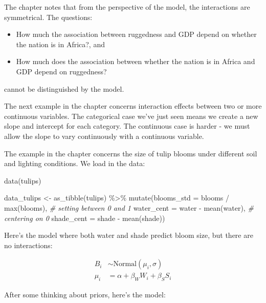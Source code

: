 \documentclass[
]{book}
\newenvironment{Shaded}{\begin{snugshade}}{\end{snugshade}}
\newcommand{\AttributeTok}[1]{\textcolor[rgb]{0.77,0.63,0.00}{#1}}
\newcommand{\CommentTok}[1]{\textcolor[rgb]{0.56,0.35,0.01}{\textit{#1}}}
\newcommand{\FunctionTok}[1]{\textcolor[rgb]{0.00,0.00,0.00}{#1}}
\newcommand{\NormalTok}[1]{#1}
\newcommand{\OtherTok}[1]{\textcolor[rgb]{0.56,0.35,0.01}{#1}}
\newcommand{\SpecialCharTok}[1]{\textcolor[rgb]{0.00,0.00,0.00}{#1}}
\providecommand{\tightlist}{%
  \setlength{\itemsep}{0pt}\setlength{\parskip}{0pt}}
\begin{document}
The chapter notes that from the perspective of the model, the interactions are symmetrical. The questions:

\begin{itemize}
\tightlist
\item
  How much the association between ruggedness and GDP depend on whether the nation is in Africa?, and
\item
  How much does the association between whether the nation is in Africa and GDP depend on ruggedness?
\end{itemize}

cannot be distinguished by the model.

The next example in the chapter concerns interaction effects between two or more continuous variables. The categorical case we've just seen means we create a new slope and intercept for each category. The continuous case is harder - we must allow the slope to vary continuously with a continuous variable.

The example in the chapter concerns the size of tulip blooms under different soil and lighting conditions. We load in the data:

\begin{Shaded}
\begin{Highlighting}[]
\FunctionTok{data}\NormalTok{(tulips) }

\NormalTok{data\_tulips }\OtherTok{\textless{}{-}} \FunctionTok{as\_tibble}\NormalTok{(tulips) }\SpecialCharTok{\%\textgreater{}\%}
  \FunctionTok{mutate}\NormalTok{(}\AttributeTok{blooms\_std =}\NormalTok{ blooms }\SpecialCharTok{/} \FunctionTok{max}\NormalTok{(blooms), }\CommentTok{\# setting between 0 and 1}
         \AttributeTok{water\_cent =}\NormalTok{ water }\SpecialCharTok{{-}} \FunctionTok{mean}\NormalTok{(water), }\CommentTok{\# centering on 0}
         \AttributeTok{shade\_cent =}\NormalTok{ shade }\SpecialCharTok{{-}} \FunctionTok{mean}\NormalTok{(shade))}
\end{Highlighting}
\end{Shaded}

Here's the model where both water and shade predict bloom size, but there are no interactions:

\[
\begin{aligned}
B_i &\sim \text{Normal}(\mu_i,\sigma) \\
\mu_i &= \alpha + \beta_WW_i + \beta_SS_i
\end{aligned}
\]

After some thinking about priors, here's the model:
\end{document}
